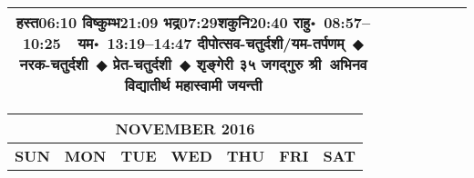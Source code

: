 \documentclass[a3paper,12pt,landscape]{article}
\newcommand{\eventsep}{~$\Diamondblack$ }
\newcommand{\To}{\hspace{1pt}\raisebox{0pt}{\tiny\RIGHTarrow}\hspace{1pt}}
\newcommand{\rahuyama}[2]{%
{राहु॰~\textsf{#1}~~यम॰~\textsf{#2}}
}
\begin{document}
\begin{center}
\begin{tabular}{|c|c|c|c|c|c|c|}
{{\mbox{हस्त\To{}\textsf{06:10\hspace{2ex}}}}%
{\mbox{विष्कुम्भ\To{}\textsf{21:09\hspace{2ex}}}}%
{\mbox{भद्र\To{}\textsf{07:29\hspace{2ex}}}\mbox{शकुनि\To{}\textsf{20:40\hspace{2ex}}}}}%
{\rahuyama{08:57--10:25}{13:19--14:47}}%
{दीपोत्सव-चतुर्दशी/यम-तर्पणम्\eventsep नरक-चतुर्दशी\eventsep प्रेत-चतुर्दशी\eventsep शृङ्गेरी ३५ जगद्गुरु श्री~अभिनव विद्यातीर्थ महास्वामी जयन्ती}
\\ \hline %
\end{tabular}



\begin{tabular}{|c|c|c|c|c|c|c|}
\multicolumn{7}{c}{\Large \bfseries \sffamily NOVEMBER 2016}\\[3mm]
\hline
\textbf{\textsf{SUN}} & \textbf{\textsf{MON}} & \textbf{\textsf{TUE}} & \textbf{\textsf{WED}} & \textbf{\textsf{THU}} & \textbf{\textsf{FRI}} & \textbf{\textsf{SAT}} \\ \hline


\end{tabular}
\end{center}
\end{document}
